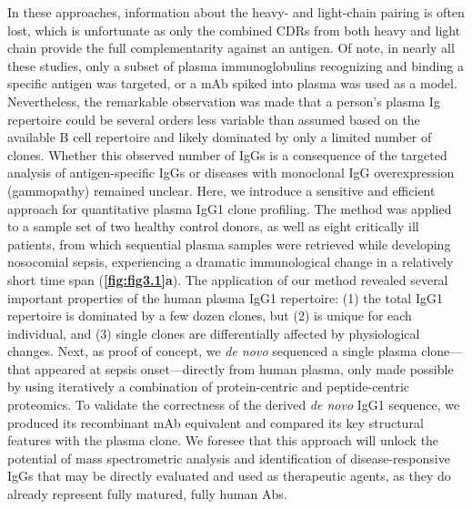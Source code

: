 In these approaches, information about the heavy- and light-chain pairing is often lost, which is unfortunate as only the combined CDRs from both heavy and light chain provide the full complementarity against an antigen. Of note, in nearly all these studies, only a subset of plasma immunoglobulins recognizing and binding a specific antigen was targeted, or a mAb spiked into plasma was used as a model. Nevertheless, the remarkable observation was made that a person’s plasma Ig repertoire could be several orders less variable than assumed based on the available B cell repertoire and likely dominated by only a limited number of clones. Whether this observed number of IgGs is a consequence of the targeted analysis of antigen-specific IgGs or diseases with monoclonal IgG overexpression (gammopathy) remained unclear.
Here, we introduce a sensitive and efficient approach for quantitative plasma IgG1 clone profiling. The method was applied to a sample set of two healthy control donors, as well as eight critically ill patients, from which sequential plasma samples were retrieved while developing nosocomial sepsis, experiencing a dramatic immunological change in a relatively short time span (\textbf{\autoref{fig:fig3.1}a}). The application of our method revealed several important properties of the human plasma IgG1 repertoire: (1) the total IgG1 repertoire is dominated by a few dozen clones, but (2) is unique for each individual, and (3) single clones are differentially affected by physiological changes. Next, as proof of concept, we \emph{de novo} sequenced a single plasma clone—that appeared at sepsis onset—directly from human plasma, only made possible by using iteratively a combination of protein-centric and peptide-centric proteomics. To validate the correctness of the derived \emph{de novo} IgG1 sequence, we produced its recombinant mAb equivalent and compared its key structural features with the plasma clone. We foresee that this approach will unlock the potential of mass spectrometric analysis and identification of disease-responsive IgGs that may be directly evaluated and used as therapeutic agents, as they do already represent fully matured, fully human Abs.
